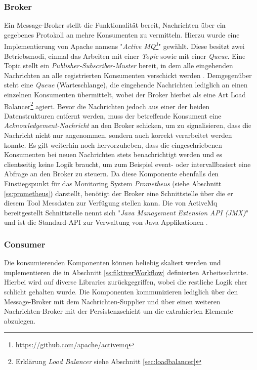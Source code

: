 \subsubsection{Broker \checkmark}
Ein Message-Broker stellt die Funktionalität bereit, Nachrichten über ein gegebenes Protokoll an mehre Konsumenten zu vermitteln. Hierzu wurde eine Implementierung von Apache namens "\emph{Active MQ\footnote{\url{https://github.com/apache/activemq}}}" gewählt. Diese besitzt zwei Betriebsmodi, einmal das Arbeiten mit einer \emph{Topic} sowie mit einer \emph{Queue}. Eine Topic stellt ein \emph{Publisher-Subscriber-Muster} bereit, in dem alle eingehenden Nachrichten an alle registrierten Konsumenten verschickt werden \cite[Seite~33 ff.]{activemq-snyder}. Demgegenüber steht eine \emph{Queue} (Warteschlange), die eingehende Nachrichten lediglich an einen einzelnen Konsumenten übermittelt, wobei der Broker hierbei als eine Art Load Balancer\footnote{Erklärung \emph{Load Balancer} siehe Abschnitt \ref{sec:loadbalancer}} agiert. Bevor die Nachrichten jedoch aus einer der beiden Datenstrukturen entfernt werden, muss der betreffende Konsument eine \emph{Acknowledgement-Nachricht} an den Broker schicken, um zu signalisieren, dass die Nachricht nicht nur angenommen, sondern auch korrekt verarbeitet werden konnte. Es gilt weiterhin noch hervorzuheben, dass die eingeschriebenen Konsumenten bei neuen Nachrichten stets benachrichtigt werden und es clientseitig keine Logik braucht, um zum Beispiel event- oder intervallbasiert eine Abfrage an den Broker zu steuern. Da diese Komponente ebenfalls den Einstiegspunkt für das Monitoring System \emph{Prometheus} (siehe Abschnitt \ref{ss:prometheus}) darstellt, benötigt der Broker eine Schnittstelle über die er diesem Tool Messdaten zur Verfügung stellen kann. Die von ActiveMq bereitgestellt Schnittstelle nennt sich "\emph{Java Management Extension API (JMX)}" und ist die Standard-API zur Verwaltung von Java Applikationen \cite[Seite~331 ff.]{activemq-snyder}.


\subsubsection{Consumer \checkmark}
Die konsumierenden Komponenten können beliebig skaliert werden und implementieren die in Abschnitt \ref{ss:fiktiverWorkflow} definierten Arbeitsschritte. Hierbei wird auf diverse Libraries zurückgegriffen, wobei die restliche Logik eher schlicht gehalten wurde. Die Komponenten kommunizieren lediglich über den Message-Broker mit dem Nachrichten-Supplier und über einen weiteren Nachrichten-Broker mit der Persistenzschicht um die extrahierten Elemente abzulegen.


